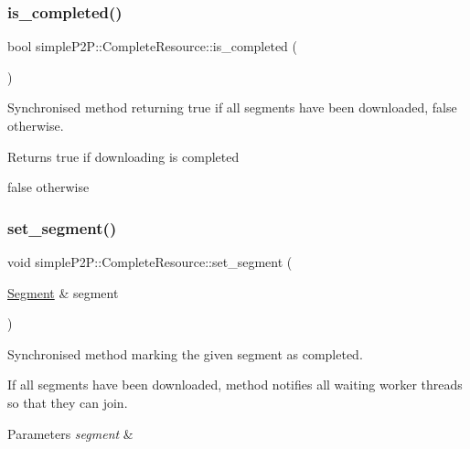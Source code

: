\subsubsection{\texorpdfstring{is\+\_\+completed()}{is\_completed()}}
{\footnotesize\ttfamily bool simple\+P2\+P\+::\+Complete\+Resource\+::is\+\_\+completed (\begin{DoxyParamCaption}{ }\end{DoxyParamCaption})}



Synchronised method returning true if all segments have been downloaded, false otherwise. 

\begin{DoxyReturn}{Returns}
true if downloading is completed 

false otherwise 
\end{DoxyReturn}
\mbox{\label{classsimpleP2P_1_1CompleteResource_a52ddae2486fb593cc315247af38014e7}} 
\subsubsection{\texorpdfstring{set\+\_\+segment()}{set\_segment()}}
{\footnotesize\ttfamily void simple\+P2\+P\+::\+Complete\+Resource\+::set\+\_\+segment (\begin{DoxyParamCaption}\item[{\hyperlink{classsimpleP2P_1_1Segment}{Segment} \&}]{segment }\end{DoxyParamCaption})}



Synchronised method marking the given segment as completed. 

If all segments have been downloaded, method notifies all waiting worker threads so that they can join.


\begin{DoxyParams}{Parameters}
{\em segment} & \\
\hline
\end{DoxyParams}
\mbox{\label{classsimpleP2P_1_1CompleteResource_af2dd5d30d807b11ecdad7feaf488df89}} 

